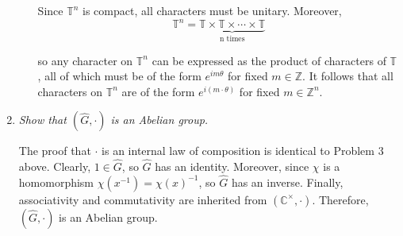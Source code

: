 \documentclass[letterpaper,11pt]{article}
\newcommand{\C}{\mathbb{C}}
\newcommand{\T}{\mathbb{T}}
\newcommand{\Z}{\mathbb{Z}}
\begin{document}
\begin{enumerate}
\begin{enumerate}
Since $\T^n$ is compact, all characters must be unitary.  Moreover,
\[
\T^n = \underbrace{\T \times \T \times \cdots \times \T}_{\mbox{n times}}
\]

so any character on $\T^n$ can be expressed as the product of characters of $\T$, all of which must be of the form $e^{im\theta}$ for fixed $m \in \Z$.  It follows that all characters on $\T^n$ are of the form $e^{i(m \cdot \theta)}$ for fixed $m \in \Z^n$.
\end{enumerate}

\item \emph{Show that $(\hat{G},\cdot)$ is an Abelian group.}

The proof that $\cdot$ is an internal law of composition is identical to Problem $3$ above.  Clearly, $1 \in \hat{G}$, so $\hat{G}$ has an identity.  Moreover, since $\chi$ is a homomorphism $\chi\left(x^{-1}\right) = \chi\left(x\right)^{-1}$, so $\hat{G}$ has an inverse.  Finally, associativity and commutativity are inherited from $(\C^\times, \cdot)$.  Therefore, $(\hat{G},\cdot)$ is an Abelian group.

\end{enumerate}
\end{document}
